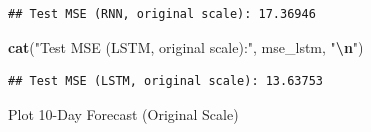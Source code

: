 \documentclass[
]{article}
\newenvironment{Shaded}{\begin{snugshade}}{\end{snugshade}}
\newcommand{\FunctionTok}[1]{\textcolor[rgb]{0.13,0.29,0.53}{\textbf{#1}}}
\newcommand{\NormalTok}[1]{#1}
\newcommand{\SpecialCharTok}[1]{\textcolor[rgb]{0.81,0.36,0.00}{\textbf{#1}}}
\newcommand{\StringTok}[1]{\textcolor[rgb]{0.31,0.60,0.02}{#1}}
\begin{document}
\begin{verbatim}
## Test MSE (RNN, original scale): 17.36946
\end{verbatim}

\begin{Shaded}
\begin{Highlighting}[]
\FunctionTok{cat}\NormalTok{(}\StringTok{"Test MSE (LSTM, original scale):"}\NormalTok{, mse\_lstm, }\StringTok{"}\SpecialCharTok{\textbackslash{}n}\StringTok{"}\NormalTok{)}
\end{Highlighting}
\end{Shaded}

\begin{verbatim}
## Test MSE (LSTM, original scale): 13.63753
\end{verbatim}

Plot 10-Day Forecast (Original Scale)
\end{document}
